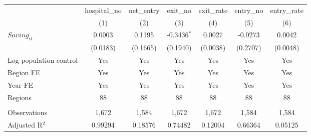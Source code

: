\begingroup
\centering
\begin{tabular}{lcccccc}
   \toprule
                          & hospital\_no  & net\_entry  & exit\_no      & exit\_rate  & entry\_no  & entry\_rate \\    
                          & (1)           & (2)         & (3)           & (4)         & (5)        & (6)\\  
   \midrule 
   $Saving_{it}$          & 0.0003        & 0.1195      & -0.3436$^{*}$ & 0.0027      & -0.0273    & 0.0042\\   
                          & (0.0183)      & (0.1665)    & (0.1940)      & (0.0038)    & (0.2707)   & (0.0048)\\   
   Log population control & Yes           & Yes         & Yes           & Yes         & Yes        & Yes\\  
   Region FE              & Yes           & Yes         & Yes           & Yes         & Yes        & Yes\\  
   Year FE                & Yes           & Yes         & Yes           & Yes         & Yes        & Yes\\  
   Regions                & 88            & 88          & 88            & 88          & 88         & 88\\  
    \\
   Observations           & 1,672         & 1,584       & 1,672         & 1,672       & 1,584      & 1,584\\  
   Adjusted R$^2$         & 0.99294       & 0.18576     & 0.74482       & 0.12004     & 0.66364    & 0.05125\\  
   \bottomrule
\end{tabular}
\par\endgroup
